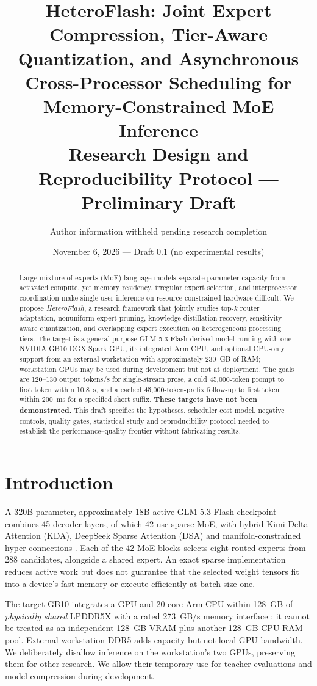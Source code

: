 \documentclass[10pt,twocolumn]{article}
\title{\vspace{-1.0em}\textbf{HeteroFlash: Joint Expert Compression, Tier-Aware Quantization, and Asynchronous Cross-Processor Scheduling for Memory-Constrained MoE Inference}\\[0.5em]\large Research Design and Reproducibility Protocol --- Preliminary Draft}
\author{Author information withheld pending research completion}
\date{November 6, 2026 --- Draft 0.1 (no experimental results)}
\begin{document}
\maketitle
\begin{abstract}
Large mixture-of-experts (MoE) language models separate parameter capacity from activated compute, yet memory residency, irregular expert selection, and interprocessor coordination make single-user inference on resource-constrained hardware difficult. We propose \emph{HeteroFlash}, a research framework that jointly studies top-$k$ router adaptation, nonuniform expert pruning, knowledge-distillation recovery, sensitivity-aware quantization, and overlapping expert execution on heterogeneous processing tiers. The target is a general-purpose GLM-5.3-Flash-derived model running with one NVIDIA GB10 DGX Spark GPU, its integrated Arm CPU, and optional CPU-only support from an external workstation with approximately 230~GB of RAM; workstation GPUs may be used during development but not at deployment. The goals are 120--130 output tokens/s for single-stream prose, a cold 45,000-token prompt to first token within 10.8~s, and a cached 45,000-token-prefix follow-up to first token within 200~ms for a specified short suffix. \textbf{These targets have not been demonstrated.} This draft specifies the hypotheses, scheduler cost model, negative controls, quality gates, statistical study and reproducibility protocol needed to establish the performance--quality frontier without fabricating results.
\end{abstract}

\section{Introduction}
A 320B-parameter, approximately 18B-active GLM-5.3-Flash checkpoint combines 45 decoder layers, of which 42 use sparse MoE, with hybrid Kimi Delta Attention (KDA), DeepSeek Sparse Attention (DSA) and manifold-constrained hyper-connections \cite{nvidia-glm-doc}. Each of the 42 MoE blocks selects eight routed experts from 288 candidates, alongside a shared expert. An exact sparse implementation reduces active work but does not guarantee that the selected weight tensors fit into a device's fast memory or execute efficiently at batch size one.

The target GB10 integrates a GPU and 20-core Arm CPU within 128~GB of \emph{physically shared} LPDDR5X with a rated 273~GB/s memory interface \cite{nvidia-spark}; it cannot be treated as an independent 128~GB VRAM plus another 128~GB CPU RAM pool. External workstation DDR5 adds capacity but not local GPU bandwidth. We deliberately disallow inference on the workstation's two GPUs, preserving them for other research. We allow their temporary use for teacher evaluations and model compression during development.
\end{document}
